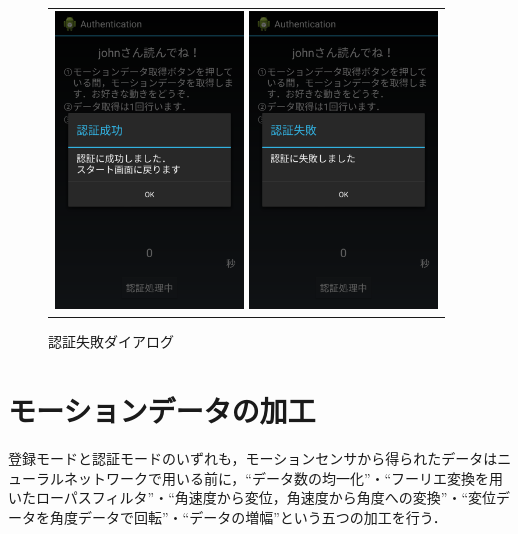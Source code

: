 \begin{figure}[bthp]
  \centering
  \begin{tabular}{c}
    \begin{minipage}{0.5\hsize}
      \centering
      \includegraphics[bb=0 0 1080 1705, width=5cm]{Screenshots/auth-succeed.pdf}
      \caption{認証成功ダイアログ}
      \label{auth-succeed}
    \end{minipage}
    \begin{minipage}{0.5\hsize}
      \centering
      \includegraphics[bb=0 0 1080 1705, width=5cm]{Screenshots/auth-failure.pdf}
      \caption{認証失敗ダイアログ}
      \label{auth-failure}
    \end{minipage}
  \end{tabular}
\end{figure}

\section{モーションデータの加工}
登録モードと認証モードのいずれも，モーションセンサから得られたデータはニューラルネットワークで用いる前に，``データ数の均一化''・``フーリエ変換を用いたローパスフィルタ''・``角速度から変位，角速度から角度への変換''・``変位データを角度データで回転''・``データの増幅''という五つの加工を行う．

